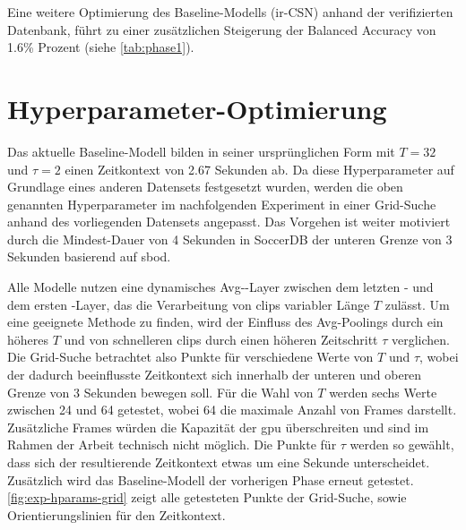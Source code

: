 Eine weitere Optimierung des Baseline-Modells (ir-CSN) anhand der verifizierten Datenbank, führt zu einer zusätzlichen Steigerung der Balanced Accuracy von 1.6\% Prozent (siehe \autoref{tab:phase1}).

\section{Hyperparameter-Optimierung}
\label{sec:hyperparameter-optimierung}

Das aktuelle Baseline-Modell bilden in seiner ursprünglichen Form mit $T=32$ und $\tau = 2$ einen Zeitkontext von 2.67 Sekunden ab.
Da diese Hyperparameter auf Grundlage eines anderen Datensets festgesetzt wurden, werden die oben genannten Hyperparameter im nachfolgenden Experiment in einer Grid-Suche anhand des vorliegenden Datensets angepasst.
Das Vorgehen ist weiter motiviert durch die Mindest-Dauer von 4 Sekunden in SoccerDB \bzw der unteren Grenze von 3 Sekunden basierend auf \gls{sbod}.

Alle Modelle nutzen eine dynamisches Avg-\pool-Layer zwischen dem letzten \conv- und dem ersten \fc-Layer, das die Verarbeitung von \glspl{clip} variabler Länge $T$ zulässt.
Um eine geeignete Methode zu finden, wird der Einfluss des Avg-Poolings durch ein höheres $T$ und von schnelleren \glspl{clip} durch einen höheren Zeitschritt $\tau$ verglichen.
Die Grid-Suche betrachtet also Punkte für verschiedene Werte von $T$ und $\tau$, wobei der dadurch beeinflusste Zeitkontext sich innerhalb der unteren und oberen Grenze von 3  Sekunden bewegen soll.
Für die Wahl von $T$ werden sechs Werte zwischen 24 und 64 getestet, wobei 64 die maximale Anzahl von Frames darstellt.
Zusätzliche Frames würden die Kapazität der \gls{gpu} überschreiten und sind im Rahmen der Arbeit technisch nicht möglich.
Die Punkte für $\tau$ werden so gewählt, dass sich der resultierende Zeitkontext etwas um eine Sekunde unterscheidet.
Zusätzlich wird das Baseline-Modell der vorherigen Phase erneut getestet.
\autoref{fig:exp-hparams-grid} zeigt alle getesteten Punkte der Grid-Suche, sowie Orientierungslinien für den Zeitkontext.

